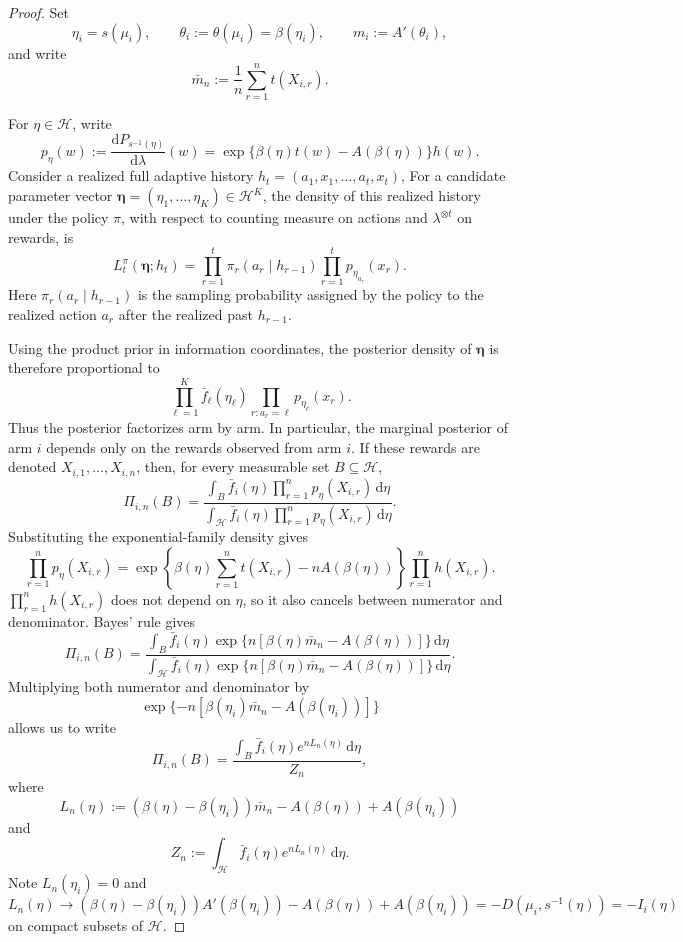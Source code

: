 \documentclass[10pt]{article}
\newcommand{\dd}{\mathrm{d}}
\theoremstyle{plain}
\begin{document}
\begin{proof}
Set
\[
    \eta_i=s(\mu_i),
    \qquad
    \theta_i:=\theta(\mu_i)=\beta(\eta_i),
    \qquad
    m_i:=A'(\theta_i),
\]
and write
\[
    \bar m_n:=\frac1n\sum_{r=1}^nt(X_{i,r}).
\]

For \(\eta\in\mathcal H\), write
\[
    p_\eta(w)
    :=
    \frac{\dd P_{s^{-1}(\eta)}}{\dd\lambda}(w)
    =
    \exp\{\beta(\eta)t(w)-A(\beta(\eta))\}h(w).
\]
Consider a realized full adaptive history $h_t=(a_1,x_1,\ldots,a_t,x_t)$,
For a candidate parameter vector
$\boldsymbol\eta=(\eta_1,\ldots,\eta_K)\in\mathcal H^K$,
the density of this realized history under the policy \(\pi\), with respect to
counting measure on actions and \(\lambda^{\otimes t}\) on rewards, is
\[
    L_t^\pi(\boldsymbol\eta;h_t)
    =
    \prod_{r=1}^t
    \pi_r(a_r\mid h_{r-1})
    \prod_{r=1}^t
    p_{\eta_{a_r}}(x_r).
\]
Here \(\pi_r(a_r\mid h_{r-1})\) is the sampling probability assigned by the
policy to the realized action \(a_r\) after the realized past \(h_{r-1}\).

Using the product prior in information coordinates, the posterior density of
\(\boldsymbol\eta\) is therefore proportional to
\[
    \prod_{\ell=1}^K
    \bar f_\ell(\eta_\ell)
    \prod_{r:a_r=\ell}
    p_{\eta_\ell}(x_r).
\]
Thus the posterior factorizes arm by arm.  In particular, the marginal posterior
of arm \(i\) depends only on the rewards observed from arm \(i\).  If these
rewards are denoted
$X_{i,1},\ldots,X_{i,n}$,
then, for every measurable set \(B\subseteq\mathcal H\),
\[
    \varPi_{i,n}(B)
    =
    \frac{
        \int_B
        \bar f_i(\eta)
        \prod_{r=1}^n p_\eta(X_{i,r})
        \,\dd\eta
    }{
        \int_{\mathcal H}
        \bar f_i(\eta)
        \prod_{r=1}^n p_\eta(X_{i,r})
        \,\dd\eta
    }.
\]
Substituting the exponential-family density gives
\[
    \prod_{r=1}^n p_\eta(X_{i,r})
    =
    \exp\left\{
        \beta(\eta)\sum_{r=1}^nt(X_{i,r})
        -
        nA(\beta(\eta))
    \right\}
    \prod_{r=1}^n h(X_{i,r}).
\]
\(\prod_{r=1}^n h(X_{i,r})\) does not depend on \(\eta\), so
it also cancels between numerator and denominator.
Bayes' rule gives
\[
    \varPi_{i,n}(B)
    =
    \frac{
        \int_B
        \bar f_i(\eta)
        \exp\{n[\beta(\eta)\bar m_n-A(\beta(\eta))]\}
        \,\dd\eta
    }{
        \int_{\mathcal H}
        \bar f_i(\eta)
        \exp\{n[\beta(\eta)\bar m_n-A(\beta(\eta))]\}
        \,\dd\eta
    }.
\]
Multiplying both numerator and denominator by
\[
    \exp\{-n[\beta(\eta_i)\bar m_n-A(\beta(\eta_i))]\}
\]
allows us to write
\[
    \varPi_{i,n}(B)
    =
    \frac{
        \int_B \bar f_i(\eta)e^{nL_n(\eta)}\,\dd\eta
    }{
        Z_n
    },
\]
where
\[
    L_n(\eta)
    :=
    (\beta(\eta)-\beta(\eta_i))\bar m_n
    -
    A(\beta(\eta))
    +
    A(\beta(\eta_i))
\]
and
\[
    Z_n
    :=
    \int_{\mathcal H}\bar f_i(\eta)e^{nL_n(\eta)}\,\dd\eta.
\]
Note \(L_n(\eta_i)=0\) and
\[
    L_n(\eta)\to (\beta(\eta)-\beta(\eta_i))A'(\beta(\eta_i)) - A(\beta(\eta))+A(\beta(\eta_i))
    = -D(\mu_i,s^{-1}(\eta))=-I_i(\eta)
\]
on compact subsets of \(\mathcal H\).




\end{proof}
\end{document}
